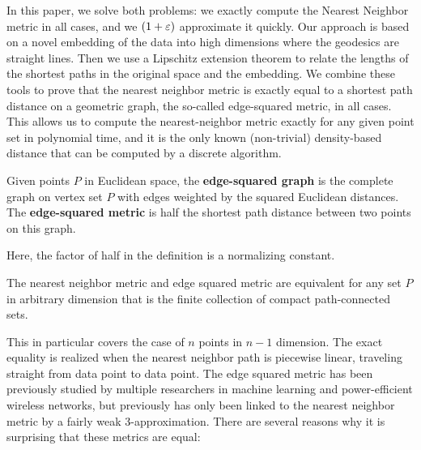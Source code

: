 In this paper, we solve both problems: we exactly compute the Nearest
Neighbor metric in all cases, and we $(1+\varepsilon)$ approximate it quickly.
Our approach is based on a novel embedding of the data into high dimensions where the geodesics are straight lines.
Then we use a Lipschitz extension theorem to relate the lengths of the shortest paths in the original space and the embedding.
We combine these tools to prove that the nearest neighbor metric is exactly equal to a shortest path distance on a geometric graph, the so-called edge-squared metric, in all cases.
This allows us to compute the nearest-neighbor metric exactly for any given point set in polynomial time, and it is the only known (non-trivial) density-based distance that can be computed by a discrete algorithm.

\begin{definition}
  Given points $P$ in Euclidean space, the \textbf{edge-squared graph} is the complete graph on vertex set $P$ with edges weighted by the squared Euclidean distances.
  The \textbf{edge-squared metric} is half the shortest path distance between two points on this graph.
\end{definition}

Here, the factor of half in the definition is a normalizing constant.

\begin{theorem}\label{thm:NN} The nearest neighbor metric and edge squared
metric are equivalent for any set $P$ in arbitrary dimension that is the
finite collection of compact path-connected sets.
\end{theorem}

This in particular covers the case of $n$ points in $n-1$ dimension. The exact equality is realized when the nearest neighbor path is piecewise
linear, traveling straight from data point to data point.
The edge squared metric has been previously studied by multiple researchers in machine learning and power-efficient wireless networks, but previously has only been linked to the nearest neighbor metric by a fairly weak 3-approximation.
There are several reasons why it is surprising that these metrics are equal:

